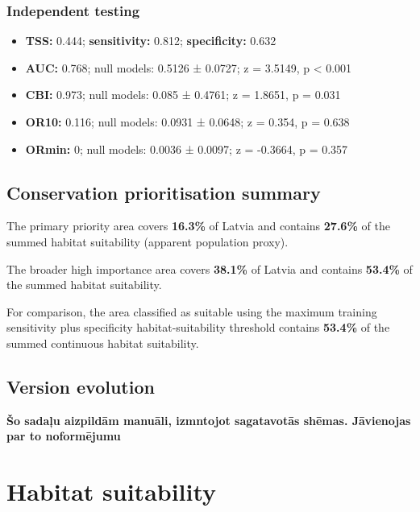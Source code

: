 \documentclass[
  openany]{book}
\providecommand{\tightlist}{%
  \setlength{\itemsep}{0pt}\setlength{\parskip}{0pt}}
\providecommand{\tightlist}{%
  \setlength{\itemsep}{0pt}%
  \setlength{\parskip}{0pt}%
}
\begin{document}
\subsubsection*{Independent testing}\label{independent-testing-18}

\begin{itemize}
\tightlist
\item
  \textbf{TSS:} 0.444; \textbf{sensitivity:} 0.812; \textbf{specificity:} 0.632
\item
  \textbf{AUC:} 0.768; null models: 0.5126 ± 0.0727; z = 3.5149, p \textless{} 0.001
\item
  \textbf{CBI:} 0.973; null models: 0.085 ± 0.4761; z = 1.8651, p = 0.031
\item
  \textbf{OR10:} 0.116; null models: 0.0931 ± 0.0648; z = 0.354, p = 0.638
\item
  \textbf{ORmin:} 0; null models: 0.0036 ± 0.0097; z = -0.3664, p = 0.357
\end{itemize}

\subsection*{Conservation prioritisation summary}\label{conservation-prioritisation-summary-18}

The primary priority area covers \textbf{16.3\%} of Latvia and contains \textbf{27.6\%} of the summed habitat suitability (apparent population proxy).

The broader high importance area covers \textbf{38.1\%} of Latvia and contains \textbf{53.4\%} of the summed habitat suitability.

For comparison, the area classified as suitable using the maximum training sensitivity plus specificity habitat-suitability threshold contains \textbf{53.4\%} of the summed continuous habitat suitability.

\subsection*{Version evolution}\label{version-evolution-18}

\textbf{Šo sadaļu aizpildām manuāli, izmntojot sagatavotās shēmas. Jāvienojas par to noformējumu}

\section*{Habitat suitability}\label{habitat-suitability-18}
\end{document}
